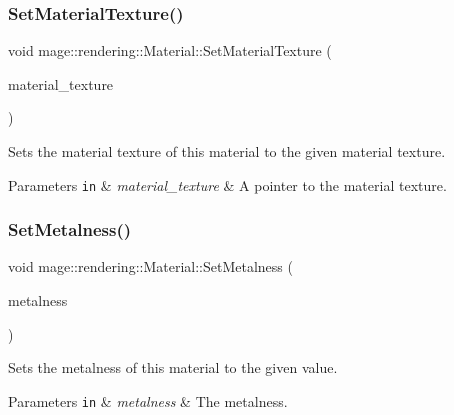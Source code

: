 \subsubsection{\texorpdfstring{Set\+Material\+Texture()}{SetMaterialTexture()}}
{\footnotesize\ttfamily void mage\+::rendering\+::\+Material\+::\+Set\+Material\+Texture (\begin{DoxyParamCaption}\item[{\hyperlink{namespacemage_1_1rendering_a6f3ae54f825328465b0cdde0f0de4a36}{Texture\+Ptr}}]{material\+\_\+texture }\end{DoxyParamCaption})\hspace{0.3cm}{\ttfamily [noexcept]}}

Sets the material texture of this material to the given material texture.


\begin{DoxyParams}[1]{Parameters}
\mbox{\tt in}  & {\em material\+\_\+texture} & A pointer to the material texture. \\
\hline
\end{DoxyParams}
\hypertarget{classmage_1_1rendering_1_1_material_a46b3297fb948c4fec3447caa35f96918}{}\label{classmage_1_1rendering_1_1_material_a46b3297fb948c4fec3447caa35f96918} 
\subsubsection{\texorpdfstring{Set\+Metalness()}{SetMetalness()}}
{\footnotesize\ttfamily void mage\+::rendering\+::\+Material\+::\+Set\+Metalness (\begin{DoxyParamCaption}\item[{\hyperlink{namespacemage_aa97e833b45f06d60a0a9c4fc22ae02c0}{F32}}]{metalness }\end{DoxyParamCaption})\hspace{0.3cm}{\ttfamily [noexcept]}}

Sets the metalness of this material to the given value.


\begin{DoxyParams}[1]{Parameters}
\mbox{\tt in}  & {\em metalness} & The metalness. \\
\hline
\end{DoxyParams}
\hypertarget{classmage_1_1rendering_1_1_material_a5700b990bfd59c497e07ee6682ffbf06}{}\label{classmage_1_1rendering_1_1_material_a5700b990bfd59c497e07ee6682ffbf06} 
